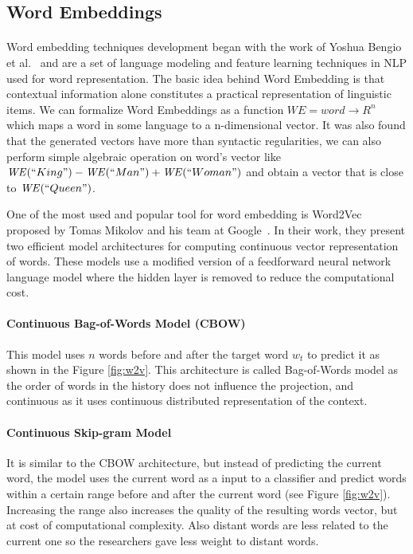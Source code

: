 \subsection{Word Embeddings}
\paragraph{}
Word embedding techniques development began with the work of Yoshua Bengio et al.~\cite{bengio2003neural} and are a set of language modeling and feature learning techniques in NLP used for word representation. The basic idea behind Word Embedding is that  contextual information alone constitutes a practical representation of linguistic items. We can formalize Word Embeddings as a function \(\mathit{WE} = word \rightarrow R^n\) which maps a word in some language to a n-dimensional vector. 
It was also found that the generated vectors have more than syntactic regularities, we can also perform simple algebraic operation on word's vector like \(\mathit{WE} (``King")-\mathit{WE}(``Man")+\mathit{WE} (``Woman")\) and obtain a vector that is close to \(\mathit{WE}(``Queen")\).

One of the most used and popular tool for word embedding is Word2Vec proposed by Tomas Mikolov and his team at Google~\cite{mikolov2013efficient}. In their work, they present two efficient model architectures for computing continuous vector representation of words. These models use a modified version of a feedforward neural network language model where the hidden layer is removed to reduce the computational cost.

\pagebreak

\paragraph{Continuous Bag-of-Words Model (CBOW)}
This model uses \(n\) words before and after the target word \(w_t\) to predict it as shown in the Figure \ref{fig:w2v}. This architecture is called Bag-of-Words model as the order of words in the history does not influence the projection, and continuous as it uses continuous distributed representation of the context.


\paragraph{Continuous Skip-gram Model}
It is similar to the CBOW architecture, but instead of predicting the current word, the model uses the current word as a input to a classifier and predict words within a certain range before and after the current word (see Figure \ref{fig:w2v}). Increasing the range also increases the quality of the resulting words vector, but at cost of computational complexity. Also distant words are less related to the current one so the researchers gave less weight to distant words.

